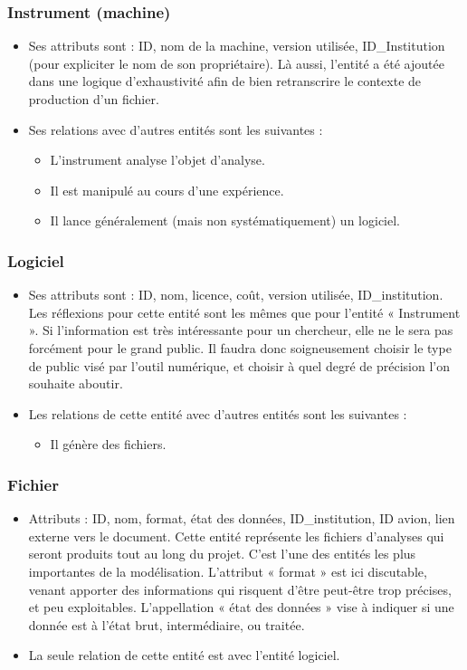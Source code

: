 \subsubsection{Instrument (machine)}
\begin{itemize}
    \item Ses attributs sont : ID, nom de la machine, version utilisée, ID\_Institution (pour expliciter le nom de son propriétaire). Là aussi, l’entité a été ajoutée dans une logique d’exhaustivité afin de bien retranscrire le contexte de production d’un fichier.
    \item Ses relations avec d’autres entités sont les suivantes : 
    \begin{itemize}
        \item L’instrument analyse l’objet d’analyse.
        \item Il est manipulé au cours d’une expérience.
        \item Il lance généralement (mais non systématiquement) un logiciel.
    \end{itemize}
\end{itemize}
\subsubsection{Logiciel}
\begin{itemize}
    \item Ses attributs sont : ID, nom, licence, coût, version utilisée, ID\_institution. Les réflexions pour cette entité sont les mêmes que pour l’entité « Instrument ». Si l’information est très intéressante pour un chercheur, elle ne le sera pas forcément pour le grand public.  Il faudra donc soigneusement choisir le type de public visé par l’outil numérique, et choisir à quel degré de précision l’on souhaite aboutir.
    \item Les relations de cette entité avec d’autres entités sont les suivantes :
    \begin{itemize}
        \item Il génère des fichiers.
    \end{itemize}
\end{itemize}
\subsubsection{Fichier}
\begin{itemize}
    \item Attributs : ID, nom, format, état des données, ID\_institution, ID avion, lien externe vers le document. Cette entité représente les fichiers d’analyses qui seront produits tout au long du projet. C’est l’une des entités les plus importantes de la modélisation. L’attribut « format » est ici discutable, venant apporter des informations qui risquent d’être peut-être trop précises, et peu exploitables. L’appellation « état des données » vise à indiquer si une donnée est à l’état brut, intermédiaire, ou traitée.
    \item La seule relation de cette entité est avec l’entité logiciel.
\end{itemize}
